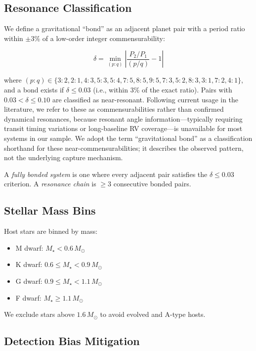 \documentclass[twocolumn]{aastex631}
\begin{document}
\subsection{Resonance Classification}

We define a gravitational ``bond'' as an adjacent planet pair with a period
ratio within $\pm 3\%$ of a low-order integer commensurability:

\begin{equation}
  \delta = \min_{(p:q)}\left|\frac{P_2/P_1}{(p/q)} - 1\right|
\end{equation}

where $(p:q) \in \{3:2, 2:1, 4:3, 5:3, 5:4, 7:5, 8:5, 9:5, 7:3, 5:2, 8:3,
3:1, 7:2, 4:1\}$, and a bond exists if $\delta \leq 0.03$ (i.e., within
3\% of the exact ratio). Pairs with $0.03 < \delta \leq 0.10$ are classified as
near-resonant. Following current usage in the literature\citep{mills2016,luger2017},
we refer to these as commensurabilities rather than confirmed dynamical
resonances, because resonant angle information---typically requiring transit
timing variations or long-baseline RV coverage---is unavailable for most
systems in our sample. We adopt the term ``gravitational bond'' as a
classification shorthand for these near-commensurabilities; it describes the
observed pattern, not the underlying capture mechanism.

A \textit{fully bonded system} is one where every adjacent pair satisfies the
$\delta \leq 0.03$ criterion. A \textit{resonance chain} is $\geq 3$
consecutive bonded pairs.

\subsection{Stellar Mass Bins}

Host stars are binned by mass:
\begin{itemize}
  \item M dwarf: $M_\star < 0.6\,M_\odot$
  \item K dwarf: $0.6 \leq M_\star < 0.9\,M_\odot$
  \item G dwarf: $0.9 \leq M_\star < 1.1\,M_\odot$
  \item F dwarf: $M_\star \geq 1.1\,M_\odot$
\end{itemize}

We exclude stars above $1.6\,M_\odot$ to avoid evolved and A-type hosts.

\subsection{Detection Bias Mitigation}
\end{document}
